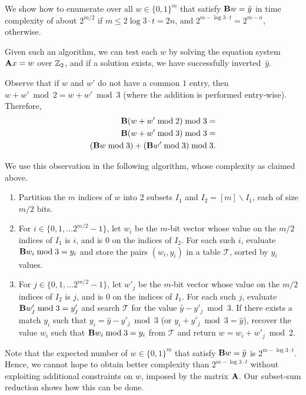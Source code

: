We show how to enumerate over all $w \in \{0,1\}^m$ that satisfy $\mat{B} w = \hat{y}$ in time complexity of about $2^{m/2}$ if $m \leq 2 \log 3 \cdot t = 2 n$, and $2^{m - \log 3 \cdot t} = 2^{m - n}$, otherwise.

Given such an algorithm, we can test each $w$ by solving the equation system $\mat{A}x = w$ over $\mathbb{Z}_2$, and if a solution exists, we have successfully inverted~$\hat{y}$.

Observe that if $w$ and $w'$ do not have a common $1$ entry, then $w + w' \bmod 2 = w + w' \bmod 3$
(where the addition is performed entry-wise). Therefore,
\begin{align}
\label{eq:lineara}
\begin{split}
\mat{B}(w + w' \bmod 2) \bmod 3 = \\
\mat{B}(w + w' \bmod 3) \bmod 3 = \\
(\mat{B}w \bmod 3) + (\mat{B}w' \bmod 3) \bmod 3.
\end{split}
\end{align}

We use this observation in the following algorithm, whose complexity as claimed above.
\begin{enumerate}
  \item Partition the $m$ indices of $w$ into 2 subsets $I_1$ and $I_2 = [m] \backslash I_1$, each of size $m/2$ bits.
  \item For $i \in \{0,1,\ldots 2^{m/2} - 1\}$, let $w_i$ be the $m$-bit vector whose value on the $m/2$ indices of $I_1$ is $i$, and is 0 on the indices of $I_2$. For each such $i$,
      evaluate $\mat{B} w_i \bmod 3 = y_i$ and store the pairs $(w_i,y_i)$ in a table $\mathcal{T}$, sorted by $y_i$ values.
  \item For $j \in \{0,1,\ldots 2^{m/2} - 1\}$, let $w'_j$ be the $m$-bit vector whose value on the $m/2$ indices of $I_2$ is $j$, and is 0 on the indices of $I_1$. For each such $j$,
      evaluate $\mat{B} w'_j \bmod 3 = y'_j$ and search $\mathcal{T}$ for the value $\hat{y} - y'_j \bmod 3$. If there exists a match $y_i$ such that $y_i = \hat{y} - y'_j \bmod 3$ (or $y_i + y'_j \bmod 3 = \hat{y}$), recover the value $w_i$ such that $\mat{B} w_i \bmod 3 = y_i$ from $\mathcal{T}$
      and return $w = w_i + w'_j \bmod 2$.
\end{enumerate}

Note that the expected number of $w \in \{0,1\}^m$ that satisfy $\mat{B} w = \hat{y}$ is $2^{m - \log 3 \cdot t}$. Hence, we cannot hope to obtain better complexity than $2^{m - \log 3 \cdot t}$ without exploiting additional constraints on $w$, imposed by the matrix $\mat{A}$. Our
subset-sum reduction shows how this can be done.

